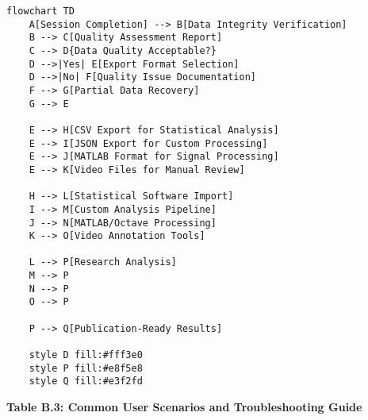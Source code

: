 \documentclass[11pt,a4paper]{article}
\begin{document}
\begin{verbatim}
flowchart TD
    A[Session Completion] --> B[Data Integrity Verification]
    B --> C[Quality Assessment Report]
    C --> D{Data Quality Acceptable?}
    D -->|Yes| E[Export Format Selection]
    D -->|No| F[Quality Issue Documentation]
    F --> G[Partial Data Recovery]
    G --> E

    E --> H[CSV Export for Statistical Analysis]
    E --> I[JSON Export for Custom Processing]
    E --> J[MATLAB Format for Signal Processing]
    E --> K[Video Files for Manual Review]

    H --> L[Statistical Software Import]
    I --> M[Custom Analysis Pipeline]
    J --> N[MATLAB/Octave Processing]
    K --> O[Video Annotation Tools]

    L --> P[Research Analysis]
    M --> P
    N --> P
    O --> P

    P --> Q[Publication-Ready Results]

    style D fill:#fff3e0
    style P fill:#e8f5e8
    style Q fill:#e3f2fd
\end{verbatim}

\textbf{Table B.3: Common User Scenarios and Troubleshooting Guide}
\end{document}
